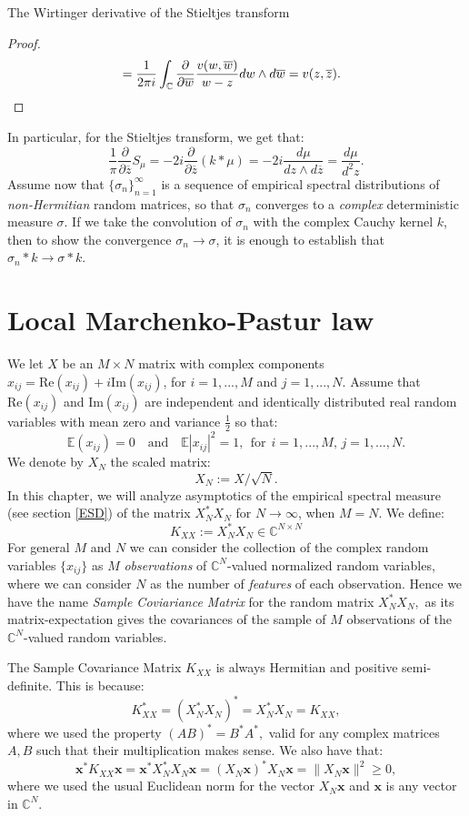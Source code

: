 \documentclass[11pt, a4paper, oneside]{book}
\numberwithin{equation}{chapter}
\newcommand{\E}{\mathbb E}
\newcommand{\beq}{\begin{equation}}
\newcommand{\eeq}{\end{equation}}
\begin{document}
\begin{section}{The Wirtinger derivative of the Stieltjes transform}
\begin{proof}
\begin{align*}
&= \frac{1}{2 \pi i}  \int_{\mathbb{C}} \frac{\partial }{\partial \overline{w}} \frac{v(w,\overline{w})}{w-z}dw \wedge d \overline{w} = v(z,\overline{z}) . \qedhere
\end{align*}
\end{proof}
%
In particular, for the Stieltjes transform, we get that:
%
\[
\frac{1}{\pi} \frac{\partial}{\partial \overline{z}} S_\mu = -2i \frac{\partial}{\partial \overline{z}} ( k \ast \mu ) = -2i \frac{d\mu}{dz \wedge d \overline{z}} =  \frac{d\mu}{d^2 z} .
\]
%
Assume now that $\{ \sigma_n \}_{n=1}^\infty$ is a sequence of empirical spectral distributions of \textit{non-Hermitian} random matrices, so that $\sigma_n$ converges to a \textit{complex} deterministic measure $\sigma.$ If we take the convolution of $\sigma_n$ with the complex Cauchy kernel $k$, then to show the convergence $\sigma_n \to \sigma$, it is enough to establish that $\sigma_n \ast k \to \sigma \ast k.$

\end{section}
\chapter{Local Marchenko-Pastur law}
%
We let $X$ be an $ M\times N$ matrix with complex components $x_{ij} = \mathrm{Re} (x_{ij}) + i \mathrm{Im} (x_{ij})$, for $i=1,...,M$ and $j=1,...,N.$ Assume that $\mathrm{Re} (x_{ij})$ and $\mathrm{Im} (x_{ij})$ are independent and identically distributed real random variables with mean zero and variance $\frac12$ so that:
%
\beq \label{e:XN1}
\E (x_{ij}) =0 \quad \textrm{and} \quad \E|x_{ij}|^2 =1, \ \  \textrm{for} \ \ i=1,...,M, \, j = 1, \dots, N.
\eeq
%
We denote by $X_N$ the scaled matrix:
\beq
\label{e:XN}
X_N :=X/\sqrt{N}.
\eeq
%
In this chapter, we will analyze asymptotics of the empirical spectral measure (see section \ref{ESD}) of the matrix $X_N^* X_N$ for $N\to \infty$, when $M=N.$ We define:
%
\beq \label{e:Kxx}
K_{XX} := X_N^* X_N \in \mathbb{C}^{N \times N}
\eeq
%
For general $M$ and $N$ we can consider the collection of the complex random variables $\{x_{ij}\}$ as $M$ \textit{observations} of $\mathbb{C}^N$-valued normalized random variables, where we can consider $N$ as the number of \textit{features} of each observation. Hence we have the name \textit{Sample Coviariance Matrix} for the random matrix $X_N^*X_N,$ as its matrix-expectation gives the covariances of the sample of $M$ observations of the $\mathbb{C}^N$-valued random variables.

The Sample Covariance Matrix $K_{XX}$ is always Hermitian and {positive semi-definite}. This is because:
%
\[
K_{XX}^* = (X_N^* X_N)^* = X_N^* X_N = K_{XX},
\]
where we used the property $(AB)^* = B^* A^*,$ valid for any complex matrices $A,B$ such that their multiplication makes sense. We also have that:
%
\[
\mathbf{x}^* K_{XX} \mathbf{x} = \mathbf{x}^* X_N^* X_N \mathbf{x} = ( X_N \mathbf{x} )^* X_N \mathbf{x} = \| X_N \mathbf{x} \|^2 \geq 0,
\]
where we used the usual Euclidean norm for the vector $X_N \mathbf{x}$ and $\mathbf{x}$ is any vector in $\mathbb{C}^N.$
\end{document}
